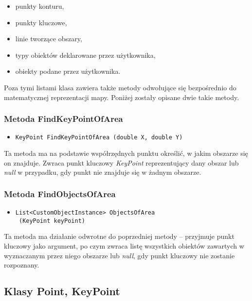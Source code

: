 \documentclass[a4paper,11pt]{article}
\begin{document}
\begin{itemize}
\item punkty konturu,
\item punkty kluczowe,
\item linie tworzące obszary,
\item typy obiektów deklarowane przez użytkownika,
\item obiekty podane przez użytkownika.
\end{itemize}

Poza tymi listami klasa zawiera także metody odwołujące się bezpośrednio do matematycznej reprezentacji mapy. Poniżej zostały opisane dwie takie metody.

\subsubsection{Metoda FindKeyPointOfArea}

\begin{itemize}
\item \begin{lstlisting}
KeyPoint FindKeyPointOfArea (double X, double Y)
\end{lstlisting}
\end{itemize}

Ta metoda ma na podstawie współrzędnych punktu określić, w jakim obszarze się on znajduje. Zwraca punkt kluczowy \textit{KeyPoint} reprezentujący dany obszar lub \textit{null} w przypadku, gdy punkt nie znajduje się w żadnym obszarze.

\subsubsection{Metoda FindObjectsOfArea}

\begin{itemize}
\item \begin{lstlisting}
List<CustomObjectInstance> ObjectsOfArea
 (KeyPoint keyPoint)
\end{lstlisting}
\end{itemize}

Ta metoda ma działanie odwrotne do poprzedniej metody -- przyjmuje punkt kluczowy jako argument, po czym zwraca listę wszystkich obiektów zawartych w wyznaczanym przez niego obszarze lub \textit{null}, gdy punkt kluczowy nie zostanie rozpoznany.

\subsection{Klasy Point, KeyPoint}
\end{document}
